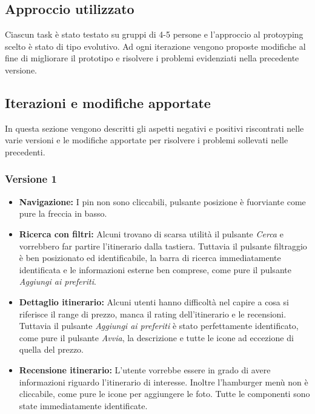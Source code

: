 \subsection{Approccio utilizzato}

Ciascun task è stato testato su gruppi di 4-5 persone e l'approccio al protoyping scelto è stato di tipo evolutivo. Ad ogni iterazione vengono proposte modifiche al fine di migliorare il prototipo e risolvere i problemi evidenziati nella precedente versione.

\clearpage

\subsection{Iterazioni e modifiche apportate}

In questa sezione vengono descritti gli aspetti negativi e positivi riscontrati nelle varie versioni e le modifiche apportate per risolvere i problemi sollevati nelle precedenti.
\subsubsection{Versione 1}

\begin{itemize}

\item \textbf{Navigazione:} I pin non sono cliccabili, pulsante posizione è fuorviante come pure la freccia in basso.

\item \textbf{Ricerca con filtri:} Alcuni trovano di scarsa utilità il pulsante \emph{Cerca} e vorrebbero far partire l'itinerario dalla tastiera. Tuttavia il pulsante filtraggio è ben posizionato ed identificabile, la barra di ricerca immediatamente identificata e le informazioni esterne ben comprese, come pure il pulsante \emph{Aggiungi ai preferiti}.

\item \textbf{Dettaglio itinerario:} Alcuni utenti hanno difficoltà nel capire a cosa si riferisce il range di prezzo, manca il rating dell’itinerario e
le recensioni. Tuttavia il pulsante \emph{Aggiungi ai preferiti} è stato perfettamente identificato, come pure il pulsante \emph{Avvia}, la descrizione e tutte le icone ad eccezione di quella del prezzo.

\item \textbf{Recensione itinerario:} L'utente vorrebbe essere in grado di avere informazioni riguardo l'itinerario di interesse. Inoltre l'hamburger menù non è cliccabile, come pure le icone per aggiungere le foto. Tutte le componenti sono state immediatamente identificate.

\end{itemize}

